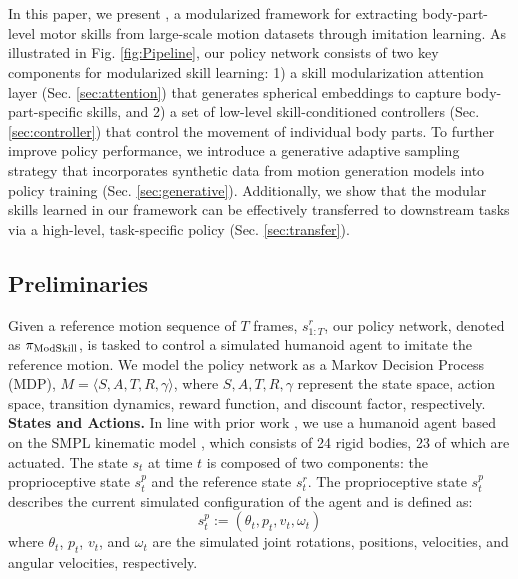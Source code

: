 \section{\name}
\label{sec:method}

In this paper, we present \name, a modularized framework for extracting body-part-level motor skills from large-scale motion datasets through imitation learning. As illustrated in Fig. \ref{fig:Pipeline}, our policy network consists of two key components for modularized skill learning: 1) a skill modularization attention layer (Sec. \ref{sec:attention}) that generates spherical embeddings to capture body-part-specific skills, and 2) a set of low-level skill-conditioned controllers (Sec. \ref{sec:controller}) that control the movement of individual body parts. To further improve policy performance, we introduce a generative adaptive sampling strategy that incorporates synthetic data from motion generation models into policy training (Sec. \ref{sec:generative}). Additionally, we show that the modular skills learned in our framework can be effectively transferred to downstream tasks via a high-level, task-specific policy (Sec. \ref{sec:transfer}).

\subsection{Preliminaries}
\label{sec:prelim}

Given a reference motion sequence of $ T $ frames, $ s^{r}_{1:T} $, our policy network, denoted as $\pi_{\text{ModSkill}}$, is tasked to control a simulated humanoid agent to imitate the reference motion. 
We model the policy network as a Markov Decision Process (MDP), $ M = \langle S, A, T, R, \gamma \rangle $, where $ S, A, T, R, \gamma $ represent the state space, action space, transition dynamics, reward function, and discount factor, respectively.\\

\noindent \textbf{States and Actions.} In line with prior work \cite{Luo2023PerpetualHC}, we use a humanoid agent based on the SMPL kinematic model \cite{SMPL:2015}, which consists of 24 rigid bodies, 23 of which are actuated. The state $ s_{t} $ at time $ t $ is composed of two components: the proprioceptive state $ s^{p}_{t} $ and the reference state $ s^{r}_{t} $. The proprioceptive state $ s^{p}_{t} $ describes the current simulated configuration of the agent and is defined as:
\begin{equation}
    s^{p}_{t} := (\theta_{t}, p_{t}, v_{t}, \omega_{t})
\end{equation}
where $ \theta_{t} $, $ p_{t} $, $ v_{t} $, and $ \omega_{t} $ are the simulated joint rotations, positions, velocities, and angular velocities, respectively.

